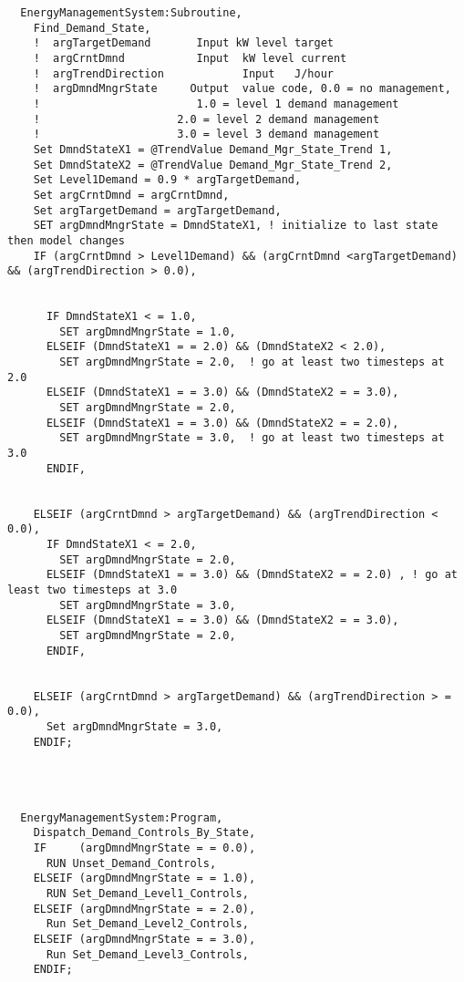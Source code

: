 \begin{lstlisting}
  EnergyManagementSystem:Subroutine,
    Find_Demand_State,
    !  argTargetDemand       Input kW level target
    !  argCrntDmnd           Input  kW level current
    !  argTrendDirection            Input   J/hour
    !  argDmndMngrState     Output  value code, 0.0 = no management,
    !                        1.0 = level 1 demand management
    !                     2.0 = level 2 demand management
    !                     3.0 = level 3 demand management
    Set DmndStateX1 = @TrendValue Demand_Mgr_State_Trend 1,
    Set DmndStateX2 = @TrendValue Demand_Mgr_State_Trend 2,
    Set Level1Demand = 0.9 * argTargetDemand,
    Set argCrntDmnd = argCrntDmnd,
    Set argTargetDemand = argTargetDemand,
    SET argDmndMngrState = DmndStateX1, ! initialize to last state then model changes
    IF (argCrntDmnd > Level1Demand) && (argCrntDmnd <argTargetDemand) && (argTrendDirection > 0.0),


      IF DmndStateX1 < = 1.0,
        SET argDmndMngrState = 1.0,
      ELSEIF (DmndStateX1 = = 2.0) && (DmndStateX2 < 2.0),
        SET argDmndMngrState = 2.0,  ! go at least two timesteps at 2.0
      ELSEIF (DmndStateX1 = = 3.0) && (DmndStateX2 = = 3.0),
        SET argDmndMngrState = 2.0,
      ELSEIF (DmndStateX1 = = 3.0) && (DmndStateX2 = = 2.0),
        SET argDmndMngrState = 3.0,  ! go at least two timesteps at 3.0
      ENDIF,


    ELSEIF (argCrntDmnd > argTargetDemand) && (argTrendDirection < 0.0),
      IF DmndStateX1 < = 2.0,
        SET argDmndMngrState = 2.0,
      ELSEIF (DmndStateX1 = = 3.0) && (DmndStateX2 = = 2.0) , ! go at least two timesteps at 3.0
        SET argDmndMngrState = 3.0,
      ELSEIF (DmndStateX1 = = 3.0) && (DmndStateX2 = = 3.0),
        SET argDmndMngrState = 2.0,
      ENDIF,


    ELSEIF (argCrntDmnd > argTargetDemand) && (argTrendDirection > = 0.0),
      Set argDmndMngrState = 3.0,
    ENDIF;




  EnergyManagementSystem:Program,
    Dispatch_Demand_Controls_By_State,
    IF     (argDmndMngrState = = 0.0),
      RUN Unset_Demand_Controls,
    ELSEIF (argDmndMngrState = = 1.0),
      RUN Set_Demand_Level1_Controls,
    ELSEIF (argDmndMngrState = = 2.0),
      Run Set_Demand_Level2_Controls,
    ELSEIF (argDmndMngrState = = 3.0),
      Run Set_Demand_Level3_Controls,
    ENDIF;





\end{lstlisting}
